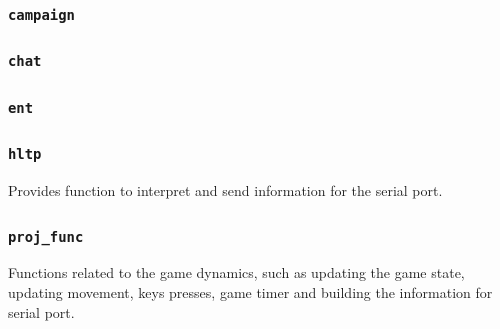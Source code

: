 \documentclass{article}
\theoremstyle{remark}
\begin{document}
\subsubsection{\texttt{campaign}}

\subsubsection{\texttt{chat}}

\subsubsection{\texttt{ent}}

\subsubsection{\texttt{hltp}}
Provides function to interpret and send information for the serial port.
\subsubsection{\texttt{proj\_func}}
Functions related to the game dynamics, such as updating the game state, updating movement, keys presses, game timer and building the information for serial port.
\end{document}
